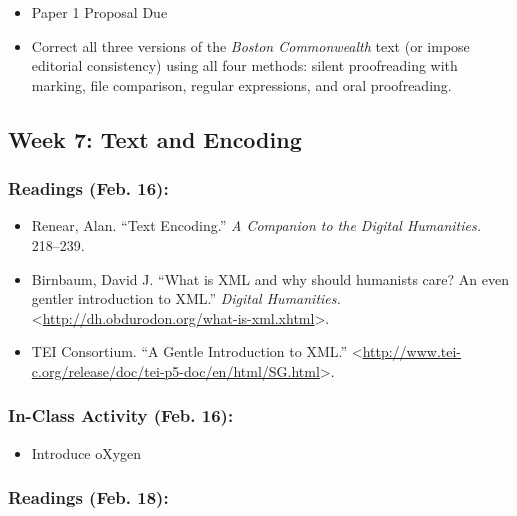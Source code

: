 \documentclass[]{article}
\begin{document}
\begin{itemize}
\itemsep1pt\parskip0pt
\item
  Paper 1 Proposal Due
\item
  Correct all three versions of the \emph{Boston Commonwealth} text (or
  impose editorial consistency) using all four methods: silent
  proofreading with marking, file comparison, regular expressions, and
  oral proofreading.
\end{itemize}

\subsection{Week 7: Text and Encoding}\label{week-7-text-and-encoding}

\subsubsection{Readings (Feb. 16):}\label{readings-feb.-16}

\begin{itemize}
\itemsep1pt\parskip0pt
\item
  Renear, Alan. ``Text Encoding.'' \emph{A Companion to the Digital
  Humanities.} 218--239.
\item
  Birnbaum, David J. ``What is XML and why should humanists care? An
  even gentler introduction to XML.'' \emph{Digital Humanities.}
  \textless{}\url{http://dh.obdurodon.org/what-is-xml.xhtml}\textgreater{}.
\item
  TEI Consortium. ``A Gentle Introduction to XML.''
  \textless{}\url{http://www.tei-c.org/release/doc/tei-p5-doc/en/html/SG.html}\textgreater{}.
\end{itemize}

\subsubsection{In-Class Activity (Feb.
16):}\label{in-class-activity-feb.-16}

\begin{itemize}
\itemsep1pt\parskip0pt
\item
  Introduce oXygen
\end{itemize}

\subsubsection{Readings (Feb. 18):}\label{readings-feb.-18}
\end{document}
